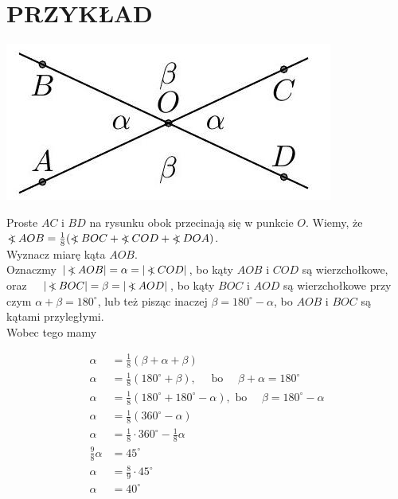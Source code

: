 \documentclass[10pt]{article}
\newcommand\Varangle{\mathop{{<\!\!\!\!\!\text{\small)}}\:}\nolimits}
\begin{document}
\section*{PRZYKŁAD}
\begin{center}
\includegraphics[max width=\textwidth]{2024_11_21_8f01584889ff06348ae7g-188}
\end{center}

Proste \(A C\) i \(B D\) na rysunku obok przecinają się w punkcie \(O\). Wiemy, że\\
\(\Varangle A O B=\frac{1}{8}(\Varangle B O C+\Varangle C O D+\Varangle D O A)\).\\
Wyznacz miarę kąta \(A O B\).\\
Oznaczmy \(|\Varangle A O B|=\alpha=|\Varangle C O D|\), bo kąty \(A O B\) i \(C O D\) są wierzchołkowe, oraz \(\quad|\Varangle B O C|=\beta=|\Varangle A O D|\), bo kąty \(B O C\) i \(A O D\) są wierzchołkowe przy czym \(\alpha+\beta=180^{\circ}\), lub też pisząc inaczej \(\beta=180^{\circ}-\alpha\), bo \(A O B\) i \(B O C\) są kątami przyległymi.\\
Wobec tego mamy

\[
\begin{aligned}
\alpha & =\frac{1}{8}(\beta+\alpha+\beta) \\
\alpha & =\frac{1}{8}\left(180^{\circ}+\beta\right), \quad \text { bo } \quad \beta+\alpha=180^{\circ} \\
\alpha & =\frac{1}{8}\left(180^{\circ}+180^{\circ}-\alpha\right), \text { bo } \quad \beta=180^{\circ}-\alpha \\
\alpha & =\frac{1}{8}\left(360^{\circ}-\alpha\right) \\
\alpha & =\frac{1}{8} \cdot 360^{\circ}-\frac{1}{8} \alpha \\
\frac{9}{8} \alpha & =45^{\circ} \\
\alpha & =\frac{8}{9} \cdot 45^{\circ} \\
\alpha & =40^{\circ}
\end{aligned}
\]
\end{document}
